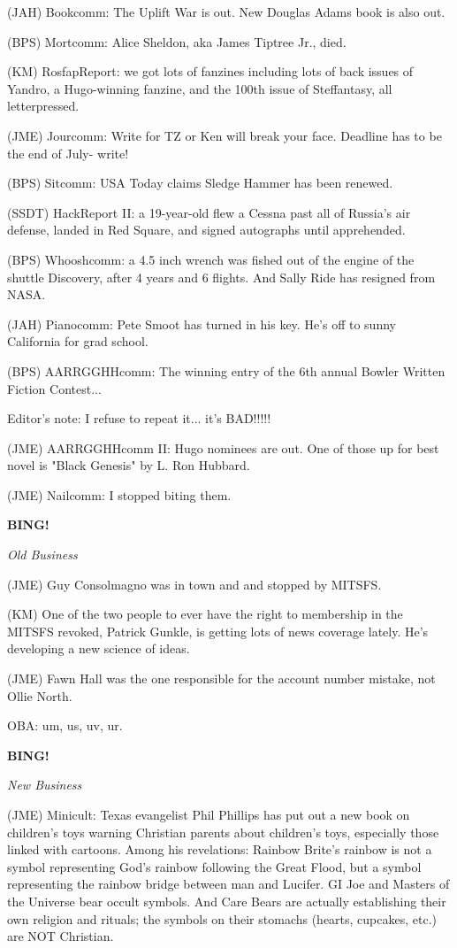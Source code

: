 \documentclass[12pt]{article}
\newcommand{\bing}{{\bf BING!} }
\newcommand{\goto}[1]{\bing \vskip 12pt \centerline{{\em{#1}}}}
\begin{document}
(JAH) Bookcomm: The Uplift War is out. New Douglas Adams book is also out.

(BPS) Mortcomm: Alice Sheldon, aka James Tiptree Jr., died.

(KM) RosfapReport: we got lots of fanzines including lots of back issues of Yandro, a Hugo-winning fanzine, and the 100th issue of Steffantasy, all letterpressed.

(JME) Jourcomm: Write for TZ or Ken will break your face. Deadline has to be the end of July- write!

(BPS) Sitcomm: USA Today claims Sledge Hammer has been renewed.

(SSDT) HackReport II: a 19-year-old flew a Cessna past all of Russia's air defense, landed in Red Square, and signed autographs until apprehended.

(BPS) Whooshcomm: a 4.5 inch wrench was fished out of the engine of the shuttle Discovery, after 4 years and 6 flights. And Sally Ride has resigned from NASA.

(JAH) Pianocomm: Pete Smoot has turned in his key. He's off to sunny California for grad school.

(BPS) AARRGGHHcomm: The winning entry of the 6th annual Bowler Written Fiction Contest...

Editor's note: I refuse to repeat it... it's BAD!!!!!

(JME) AARRGGHHcomm II: Hugo nominees are out. One of those up for best novel is "Black Genesis" by L. Ron Hubbard.

(JME) Nailcomm: I stopped biting them.

\goto{Old Business}

(JME) Guy Consolmagno was in town and and stopped by MITSFS.

(KM) One of the two people to ever have the right to membership in the MITSFS revoked, Patrick Gunkle, is getting lots of news coverage lately. He's developing a new science of ideas.

(JME) Fawn Hall was the one responsible for the account number mistake, not Ollie North.

OBA: um, us, uv, ur.

\goto{New Business}

(JME) Minicult: Texas evangelist Phil Phillips has put out a new book on children's toys warning Christian parents about children's toys, especially those linked with cartoons. Among his revelations: Rainbow Brite's rainbow is not a symbol representing God's rainbow following the Great Flood, but a symbol representing the rainbow bridge between man and Lucifer. GI Joe and Masters of the Universe bear occult symbols. And Care Bears are actually establishing their own religion and rituals; the symbols on their stomachs (hearts, cupcakes, etc.) are NOT Christian.
\end{document}
